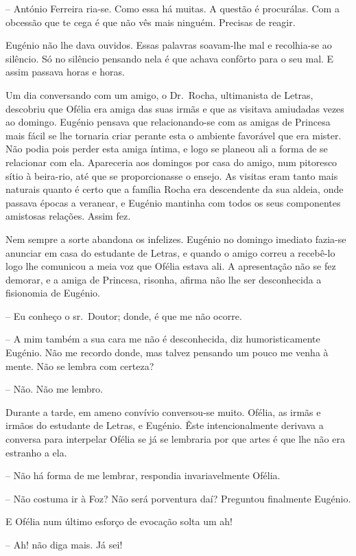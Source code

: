 \documentclass[9pt]{article}
\begin{document}
-- António Ferreira ria-se. Como essa há muitas. A questão é procurá\-las. Com a obcessão que te cega é que não vês mais nin\-guém. Precisas
de reagir.

Eugé\-nio não lhe dava ouvidos. Essas palavras soavam-\-lhe mal e
reco\-lhia-se ao silêncio. Só no silêncio pensando nela é que achava
con\-fôr\-to para o seu mal. E assim passava horas e horas.

Um dia conversando com um amigo, o Dr.\ Rocha, ultimanista de Letras, descobriu que Ofélia era amiga das suas irmãs e que as visitava amiudadas vezes ao domingo. Eugé\-nio pensava que relacionando-se com as amigas de Princesa
mais fácil se lhe tornaria criar perante esta o ambiente favorável
que era mister. Não podia pois perder esta amiga íntima, e logo se planeou ali a forma de se relacionar com ela. Apareceria aos domingos por
casa do amigo, num pitoresco sítio à beira-rio, até que se proporcionasse o ensejo. As visitas eram tanto mais naturais quanto é certo que a fa\-mí\-lia Rocha era descendente
da sua aldeia, onde passava épocas a veranear, e Eugé\-nio mantinha com todos os seus componentes amistosas rela\-ções. Assim fez.

Nem sempre a sorte abandona os infelizes. Eugé\-nio no domingo imediato fazia-se anunciar em casa do estudante de Letras, e quan\-do o amigo
correu a recebê-lo logo lhe comunicou a meia voz que Ofélia estava ali.
A apresenta\-ção não se fez demorar, e a amiga de Princesa, risonha, afirma
não lhe ser desconhecida a fisionomia de Eugé\-nio.

-- Eu conheço o sr.\ Doutor; donde, é que me não ocorre.

-- A mim também a sua cara me não é desconhecida, diz humoristicamente Eugé\-nio. Não me recordo donde, mas talvez pensando um pouco me
venha à mente. Não se lembra com certeza?

-- Não. Não me lembro.

Durante a tarde, em ameno con\-ví\-vio conversou-se muito. Ofélia, as
irmãs e irmãos do estudante de Letras, e Eugé\-nio. Êste intencionalmente derivava a conversa para interpelar Ofélia se já se lembraria por
que artes é que lhe não era estranho a ela.

-- Não há forma de me lembrar, respondia invariavelmente Ofélia.

-- Não costuma ir à Foz? Não será porventura daí? Preguntou finalmente Eugé\-nio.

E Ofélia num último esforço de evoca\-ção solta um ah!

-- Ah! não diga mais. Já sei!
\end{document}
